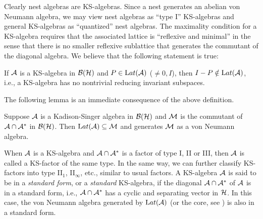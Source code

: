\vskip6pt

Clearly nest algebras are KS-algebras. Since a nest generates an
abelian von Neumann algebra, we may view nest algebras as ``type
I'' KS-algebras and general KS-algebras as ``quantized'' nest
algebras. The maximality condition for a KS-algebra requires that
the associated lattice is ``reflexive and minimal'' in the sense
that there is no smaller reflexive sublattice that generates the
commutant of the diagonal algebra. We believe that the following
statement is true:

\begin{conjecture}
If $\mathcal A$ is a KS-algebra in $\mathcal B(\mathcal H)$ and $P\in\mathrm Lat(\mathcal A)$ ($\neq 0,I$), then
$I-P\notin\mathrm Lat(\mathcal A)$, i.e., a KS-algebra has no nontrivial reducing
invariant subspaces.
\end{conjecture}

The following lemma is an immediate consequence of the above
definition.

\vskip6pt

\begin{lemma}
Suppose $\mathcal A$ is a Kadison-Singer algebra in $\mathcal B(\mathcal H)$ and $\mathcal M$ is the commutant of $\mathcal A\cap\mathcal A^*$ in $\mathcal B(\mathcal H)$. Then $\mathrm Lat(\mathcal A)\subseteq\mathcal M$ and generates
$\mathcal M$ as a von Neumann algebra.
\end{lemma}



When $\mathcal A$ is a KS-algebra and $\mathcal A\cap\mathcal A^*$ is a factor of type I,
II or III, then $\mathcal A$ is called a KS-factor of the same type. In
the same way, we can further classify KS-factors into type II$_1$,
II$_\infty$, etc., similar to usual factors. A KS-algebra $\mathcal A$ is
said to be in a {\sl standard form}, or a {\it standard}
KS-algebra, if the diagonal $\mathcal A\cap\mathcal A^*$ of $\mathcal A$ is in a standard
form, i.e., $\mathcal A\cap\mathcal A^*$ has a cyclic and separating vector in
$\mathcal H$. In this case, the von Neumann algebra generated by
$\mathrm Lat(\mathcal A)$ (or the core, see \cite{KS}) is also in a standard form.

